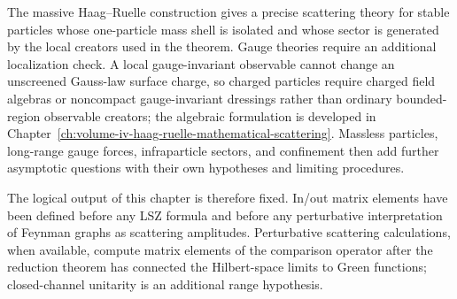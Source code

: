 The massive Haag--Ruelle construction gives a precise scattering theory for
stable particles whose one-particle mass shell is isolated and whose sector is
generated by the local creators used in the theorem.  Gauge theories require
an additional localization check.  A local gauge-invariant observable cannot
change an unscreened Gauss-law surface charge, so charged particles require
charged field algebras or noncompact gauge-invariant dressings rather than
ordinary bounded-region observable creators; the algebraic formulation is
developed in
Chapter~\ref{ch:volume-iv-haag-ruelle-mathematical-scattering}.  Massless particles, long-range
gauge forces, infraparticle sectors, and confinement then add further
asymptotic questions with their own hypotheses and limiting procedures.

The logical output of this chapter is therefore fixed.  In/out matrix elements
have been defined before any LSZ formula and before any perturbative
interpretation of Feynman graphs as scattering amplitudes.  Perturbative
scattering calculations, when available, compute matrix elements of the
comparison operator after the reduction theorem has connected the
Hilbert-space limits to Green functions; closed-channel unitarity is an
additional range hypothesis.
